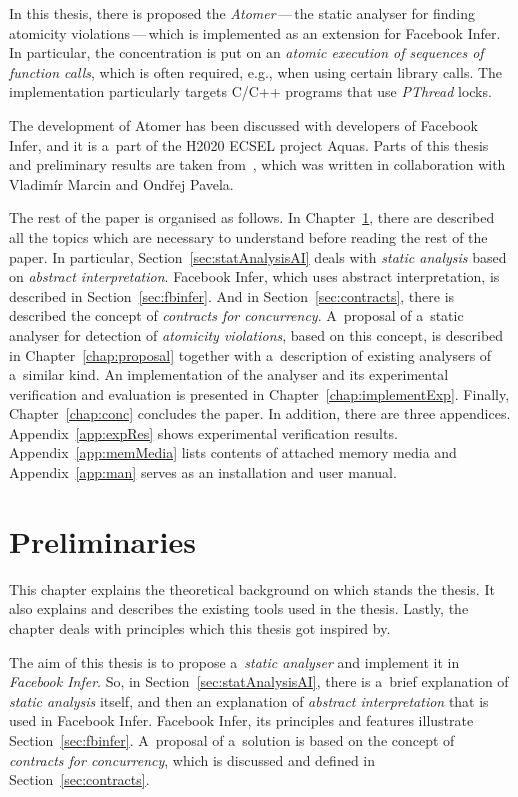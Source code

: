 In this thesis, there is proposed the \emph{Atomer}\,---\,the static
analyser for finding atomicity violations\,---\,which is implemented as
an extension for Facebook Infer. In particular, the concentration is put
on an \emph{atomic execution of sequences of function calls}, which is often
required, e.g., when using certain library calls. The implementation
particularly targets C/C++ programs that use \emph{PThread} locks.

The development of Atomer has been discussed with developers of
Facebook Infer, and it is a~part of the H2020 ECSEL project Aquas. Parts
of this thesis and preliminary results are taken from~\cite{excel2019FBInfer},
which was written in collaboration with Vladimír Marcin and Ondřej Pavela.

The rest of the paper is organised as follows. In
Chapter~\ref{chap:prelim}, there are described all the topics
which are necessary to understand before reading the rest of the paper. In
particular, Section~\ref{sec:statAnalysisAI} deals with
\emph{static analysis} based on \emph{abstract interpretation}.
Facebook Infer, which uses abstract interpretation, is described in
Section~\ref{sec:fbinfer}. And in Section~\ref{sec:contracts}, there is
described the concept of \emph{contracts for concurrency}. A~proposal of
a~static analyser for detection of \emph{atomicity violations}, based on this
concept, is described in Chapter~\ref{chap:proposal} together with
a~description of existing analysers of a~similar kind. An implementation
of the analyser and its experimental verification and evaluation is
presented in Chapter~\ref{chap:implementExp}. Finally, Chapter~\ref{chap:conc}
concludes the paper. In addition, there are three appendices.
Appendix~\ref{app:expRes} shows experimental verification results.
Appendix~\ref{app:memMedia} lists contents of attached memory media and
Appendix~\ref{app:man} serves as an installation and user manual.



\chapter{Preliminaries}
\label{chap:prelim}

This chapter explains the theoretical background on which stands the
thesis. It also explains and describes the existing tools used in the
thesis. Lastly, the chapter deals with principles which this thesis
got inspired by.

The aim of this thesis is to propose a~\emph{static analyser} and implement
it in \emph{Facebook Infer}. So, in Section~\ref{sec:statAnalysisAI},
there is a~brief explanation of \emph{static analysis} itself, and then an
explanation of \emph{abstract interpretation} that is used in Facebook Infer.
Facebook Infer, its principles and features illustrate
Section~\ref{sec:fbinfer}. A~proposal of a~solution is based on the
concept of \emph{contracts for concurrency}, which is discussed and defined
in Section~\ref{sec:contracts}.


